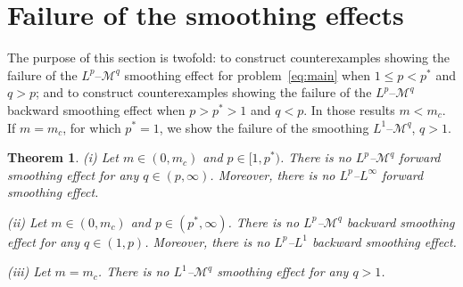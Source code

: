 \documentclass[leqno,12pt]{amsart}
\newtheorem{theorem}{Theorem}[section]
\theoremstyle{definition}
\theoremstyle{remark}
\numberwithin{equation}{section}
\begin{document}
\section{Failure of the smoothing effects}\label{sec:failure of se}

The purpose of this section is twofold: to construct counterexamples showing the failure of the $L^p$--$\mathcal{M }^q$ smoothing effect for problem~\eqref{eq:main} when $1\le p < p^*$ and $q>p$; and to construct counterexamples showing the failure of the $L^p$--$\mathcal{M }^q$ backward smoothing effect when $p > p^*>1$ and $q<p$. In those results  $m<m_c$. If $m=m_c$, for which $p^*=1$, we show the failure of the smoothing $L^1$--$\mathcal{M }^q$, $q>1$.


\begin{theorem}\label{failure of $L^p$--$L^q$}
    \noindent\textup{(i)} Let  $m\in(0,m_c)$ and $p\in[1, p^*)$. There is no $L^p$--$\mathcal{M }^q$ forward smoothing effect for any $q\in(p,\infty)$. Moreover, there is no $L^p$--$L^\infty$ forward smoothing effect.

    \noindent\textup{(ii)} Let  $m\in(0,m_c)$ and $p\in(p^*,\infty)$. There is no $L^p$--$\mathcal{M}^q$ backward smoothing effect for any $q\in(1,p)$. Moreover, there is no $L^p$--$L^1$ backward smoothing effect.

    \noindent\textup{(iii)} Let  $m=m_c$. There is no $L^1$--$\mathcal{M }^q$ smoothing effect for any $q>1$.
\end{theorem}
\end{document}
